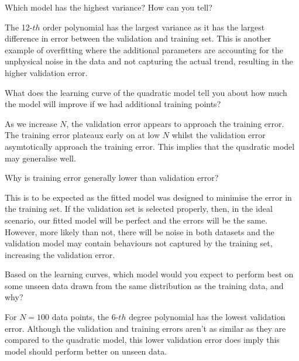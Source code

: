 \begin{problem}[3]
  Which model has the highest variance? How can you tell?
\end{problem}
\begin{solution}
  The 12-$th$ order polynomial has the largest variance as it has the largest difference in error between the validation and training set. This is another example of overfitting where the additional parameters are accounting for the unphysical noise in the data and not capturing the actual trend, resulting in the higher validation error.
\end{solution}

\begin{problem}[3]
  What does the learning curve of the quadratic model tell you about how much the model will improve if we had additional training points?
\end{problem}
\begin{solution}
 As we increase $N$, the validation error appears to approach the training error. The training error plateaux early on at low $N$ whilst the validation error asymtotically approach the training error. This implies that the quadratic model may generalise well.
\end{solution}

\begin{problem}[3]
  Why is training error generally lower than validation error?
\end{problem}
\begin{solution}
  This is to be expected as the fitted model was designed to minimise the error in the training set. If the validation set is selected properly, then, in the ideal scenario, our fitted model will be perfect and the errors will be the same. However, more likely than not, there will be noise in both datasets and the validation model may contain behaviours not captured by the training set, increasing the validation error. 
\end{solution}

\begin{problem}[3]
  Based on the learning curves, which model would you expect to perform best on some unseen data drawn from the same distribution as the training data, and why?
\end{problem}
\begin{solution}
  For $N=100$ data points, the 6-$th$ degree polynomial has the lowest validation error. Although the validation and training errors aren't as similar as they are compared to the quadratic model, this lower validation error does imply this model should perform better on unseen data.
\end{solution}




